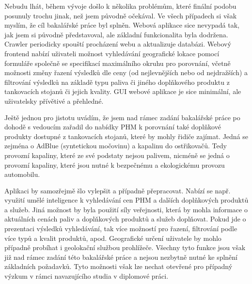 \begin{enumerate}
        Nebudu lhát, během vývoje došlo k několika problémům, které
        finální podobu posunuly trochu jinak, než jsem původně očekával.
        Ve všech případech si však myslím, že cíl bakalářské práce byl
        splněn. Webová aplikace sice nevypadá tak, jak jsem si původně
        představoval, ale základní funkcionalita byla dodržena.
        Crawler periodicky spouští procházení webu a aktualizuje databázi.
        Webový frontend nabízí uživateli možnost vyhledávání geografické
        lokace pomocí formuláře společně se specifikací maximálního okruhu
        pro porovnání, včetně možnosti změny řazení výsledků dle ceny
        (od nejlevnějších nebo od nejdražších) a filtrování výsledků
        na základě typu paliva či jiného doplňkového produktu z tankovacích
        stojanů či jejich kvality. GUI webové aplikace je sice minimální,
        ale uživatelsky přívětivé a přehledné.
\end{enumerate}

Ještě jednou pro jistotu uvádím, že jsem nad rámec zadání bakalářské práce
po dohodě s vedoucím zařadil do nabídky PHM k porovnání také doplňkové
produkty dostupné z tankovacích stojanů, které by mohly řidiče zajímat.
Jedná se zejména o AdBlue (syntetickou močovinu) a kapalinu do ostřikovačů.
Tedy provozní kapaliny, které ze své podstaty nejsou palivem, nicméně se jedná
o provozní kapaliny, které jsou nutné k bezpečnému a ekologickému provozu
automobilu.

Aplikaci by samozřejmě šlo vylepšit a případně přepracovat. Nabízí se např.
využití umělé inteligence k vyhledávání cen PHM a dalších doplňkových
produktů a služeb. Jiná možnost by byla použití síly veřejnosti, která
by mohla informace o aktuálních cenách paliv a doplňkových produktů a služeb
doplňovat. Pokud jde o prezentaci výsledků vyhledávání, tak více možností
pro řazení, filtrování podle více typů a kvalit produktů, apod. Geografické
určení uživatele by mohlo případně probíhat i geolokační službou prohlížeče.
Všechny tyto funkce jsou však již nad rámec zadání této bakalářské práce
a nejsou nezbytně nutné ke splnění základních požadavků. Tyto možnosti však
lze nechat otevřené pro případný výzkum v rámci navazujícího studia
v diplomové práci.

\endinput
